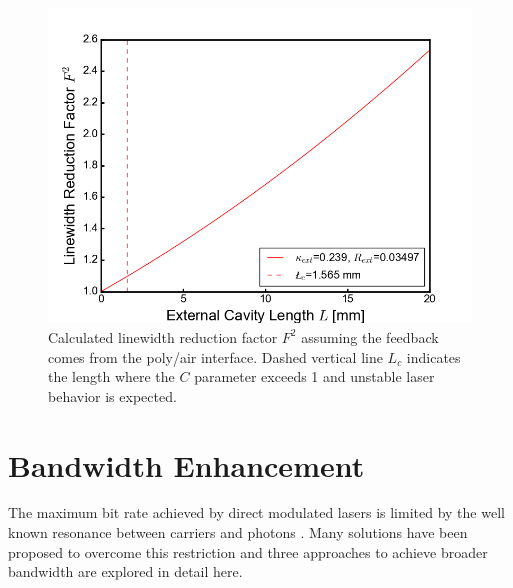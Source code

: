 \begin{figure}[ht]
    \centering
    \includegraphics[width=.7\linewidth]{figures/F_reduction_factor.png}
    \caption{Calculated linewidth reduction factor $F^2$ assuming the feedback comes from the poly/air interface. Dashed vertical line $L_c$ indicates the length where the $C$ parameter exceeds 1 and unstable laser behavior is expected.}
    \label{fig:F_reduction_factor}
\end{figure}

\section{Bandwidth Enhancement}\label{sec:bandwidth_enhancement}
The maximum bit rate achieved by direct modulated lasers is limited by the well known resonance between carriers and photons \cite{coldren2012diode}. Many solutions have been proposed to overcome this restriction and three approaches to achieve broader bandwidth are explored in detail here. 
